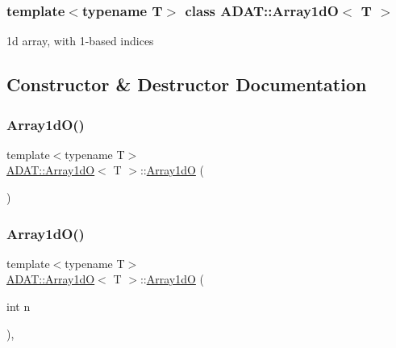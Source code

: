 \subsubsection*{template$<$typename T$>$\newline
class A\+D\+A\+T\+::\+Array1d\+O$<$ T $>$}

1d array, with 1-\/based indices 

\subsection{Constructor \& Destructor Documentation}
\mbox{\label{classADAT_1_1Array1dO_af55d30db029bb654a123544dfc155e6a}} 
\subsubsection{\texorpdfstring{Array1dO()}{Array1dO()}\hspace{0.1cm}{\footnotesize\ttfamily [1/15]}}
{\footnotesize\ttfamily template$<$typename T$>$ \\
\mbox{\hyperlink{classADAT_1_1Array1dO}{A\+D\+A\+T\+::\+Array1dO}}$<$ T $>$\+::\mbox{\hyperlink{classADAT_1_1Array1dO}{Array1dO}} (\begin{DoxyParamCaption}{ }\end{DoxyParamCaption})\hspace{0.3cm}{\ttfamily [inline]}}

\mbox{\label{classADAT_1_1Array1dO_abd486987192b85b2cd27fd28660168bf}} 
\subsubsection{\texorpdfstring{Array1dO()}{Array1dO()}\hspace{0.1cm}{\footnotesize\ttfamily [2/15]}}
{\footnotesize\ttfamily template$<$typename T$>$ \\
\mbox{\hyperlink{classADAT_1_1Array1dO}{A\+D\+A\+T\+::\+Array1dO}}$<$ T $>$\+::\mbox{\hyperlink{classADAT_1_1Array1dO}{Array1dO}} (\begin{DoxyParamCaption}\item[{int}]{n }\end{DoxyParamCaption})\hspace{0.3cm}{\ttfamily [inline]}, {\ttfamily [explicit]}}


